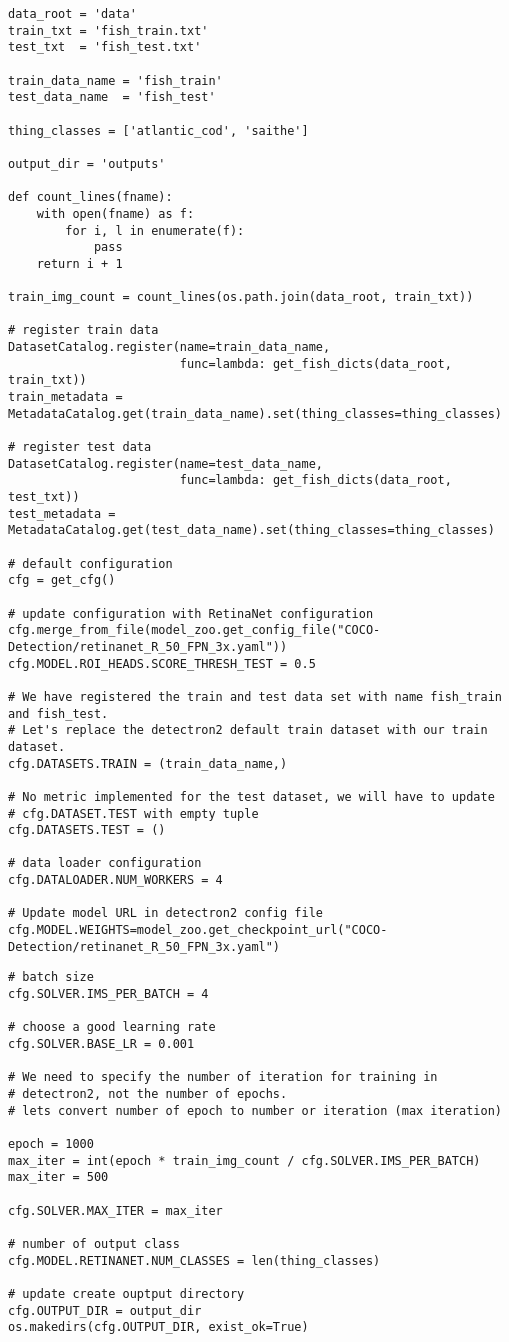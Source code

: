 \begin{verbatim}
data_root = 'data'
train_txt = 'fish_train.txt'
test_txt  = 'fish_test.txt'

train_data_name = 'fish_train'
test_data_name  = 'fish_test'

thing_classes = ['atlantic_cod', 'saithe']

output_dir = 'outputs'

def count_lines(fname):
    with open(fname) as f:
        for i, l in enumerate(f):
            pass
    return i + 1

train_img_count = count_lines(os.path.join(data_root, train_txt))

# register train data
DatasetCatalog.register(name=train_data_name,
                        func=lambda: get_fish_dicts(data_root, train_txt))
train_metadata = MetadataCatalog.get(train_data_name).set(thing_classes=thing_classes)

# register test data
DatasetCatalog.register(name=test_data_name,
                        func=lambda: get_fish_dicts(data_root, test_txt))
test_metadata = MetadataCatalog.get(test_data_name).set(thing_classes=thing_classes)

# default configuration
cfg = get_cfg()

# update configuration with RetinaNet configuration
cfg.merge_from_file(model_zoo.get_config_file("COCO-Detection/retinanet_R_50_FPN_3x.yaml"))
cfg.MODEL.ROI_HEADS.SCORE_THRESH_TEST = 0.5

# We have registered the train and test data set with name fish_train and fish_test.
# Let's replace the detectron2 default train dataset with our train dataset.
cfg.DATASETS.TRAIN = (train_data_name,)

# No metric implemented for the test dataset, we will have to update
# cfg.DATASET.TEST with empty tuple
cfg.DATASETS.TEST = ()

# data loader configuration
cfg.DATALOADER.NUM_WORKERS = 4

# Update model URL in detectron2 config file
cfg.MODEL.WEIGHTS=model_zoo.get_checkpoint_url("COCO-Detection/retinanet_R_50_FPN_3x.yaml")
\end{verbatim}

\begin{verbatim}
# batch size
cfg.SOLVER.IMS_PER_BATCH = 4

# choose a good learning rate
cfg.SOLVER.BASE_LR = 0.001

# We need to specify the number of iteration for training in
# detectron2, not the number of epochs.
# lets convert number of epoch to number or iteration (max iteration)

epoch = 1000
max_iter = int(epoch * train_img_count / cfg.SOLVER.IMS_PER_BATCH)
max_iter = 500

cfg.SOLVER.MAX_ITER = max_iter

# number of output class
cfg.MODEL.RETINANET.NUM_CLASSES = len(thing_classes)

# update create ouptput directory
cfg.OUTPUT_DIR = output_dir
os.makedirs(cfg.OUTPUT_DIR, exist_ok=True)
\end{verbatim}

